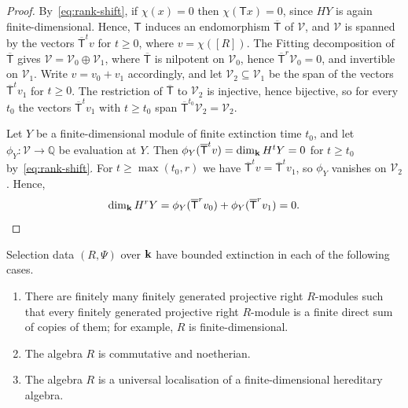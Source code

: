 \begin{proof}
  By~\eqref{eq:rank-shift}, if ${\chi(x)=0}$ then ${\chi(\mathsf{T}x)=0}$, since
  $HY$ is again finite-dimensional. Hence, $\mathsf{T}$ induces an endomorphism
  $\overline{\mathsf{T}}$ of $\mathcal{V}$, and $\mathcal{V}$ is spanned by the
  vectors $\overline{\mathsf{T}}^tv$ for ${t\geq0}$, where ${v=\chi([R])}$. The
  Fitting decomposition of $\overline{\mathsf{T}}$ gives
  ${\mathcal{V}=\mathcal{V}_0\oplus\mathcal{V}_1}$, where $\overline{\mathsf{T}}$
  is nilpotent on $\mathcal{V}_0$, hence
  ${\overline{\mathsf{T}}^r\mathcal{V}_0=0}$,
  and invertible on $\mathcal{V}_1$. Write ${v=v_0+v_1}$ accordingly, and let
  ${\mathcal{V}_2\subseteq\mathcal{V}_1}$ be the span of the vectors
  $\overline{\mathsf{T}}^tv_1$ for ${t\geq0}$. The restriction of
  $\overline{\mathsf{T}}$ to $\mathcal{V}_2$ is injective, hence bijective, so
  for every $t_0$ the vectors $\overline{\mathsf{T}}^tv_1$ with ${t\geq t_0}$
  span ${\overline{\mathsf{T}}^{t_0}\mathcal{V}_2=\mathcal{V}_2}$.

  Let $Y$ be a finite-dimensional module of finite extinction time $t_0$, and
  let ${\phi_Y\colon\mathcal{V}\to\mathbb{Q}}$ be evaluation at $Y$. Then
  ${\phi_Y(\overline{\mathsf{T}}^tv)=\dim_{\mathbf{k}} H^tY=0}$ for ${t\geq t_0}$
  by~\eqref{eq:rank-shift}. For ${t\geq\max(t_0,r)}$ we have
  ${\overline{\mathsf{T}}^tv=\overline{\mathsf{T}}^tv_1}$, so $\phi_Y$ vanishes on
  $\mathcal{V}_2$. Hence,
  \[
    \dim_{\mathbf{k}} H^rY=\phi_Y(\overline{\mathsf{T}}^rv_0)+
    \phi_Y(\overline{\mathsf{T}}^rv_1)=0.\qedhere
  \]
\end{proof}

\begin{corollary}
  \label{coro:rank-obstruction}
  Selection data $(R,\Psi)$ over $\mathbf{k}$ have bounded extinction in each of the
  following cases.
  \begin{enumerate}
    \item\label{it:rank-finite-list} There are finitely many finitely
      generated projective right $R$-modules such that every finitely
      generated projective right $R$-module is a finite direct sum of copies
      of them; for example, $R$ is finite-dimensional.
    \item\label{it:rank-noetherian} The algebra $R$ is commutative and
      noetherian.
    \item\label{it:rank-localisation} The algebra $R$ is a universal
      localisation of a finite-dimensional hereditary algebra.
  \end{enumerate}
\end{corollary}

